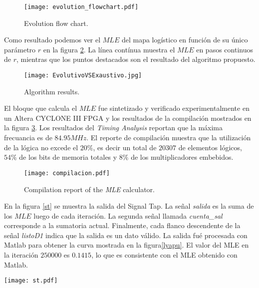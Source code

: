 \begin{figure}
	\centering
	\texttt{[image: evolution\_flowchart.pdf]}\\
	\caption{Evolution flow chart.}\label{diagramaflujo2}
\end{figure}

Como resultado podemos ver el $MLE$ del mapa logístico en función de su único parámetro $r$ en la figura \ref{resultadoAlgorithm}.
La línea contínua muestra el $MLE$ en pasos continuos de $r$, mientras que los puntos destacados son el resultado del algoritmo propuesto.

\begin{figure}
	\centering
	\texttt{[image: EvolutivoVSExaustivo.jpg]}\\
	\caption{Algorithm results.}\label{resultadoAlgorithm}
\end{figure}

El bloque que calcula el $MLE$ fue sintetizado y verificado experimentalmente en un Altera CYCLONE III FPGA y los resultados de la compilación mostrados en la figura \ref{compilacion}.
Los resultados del \textit{Timing Analysis} reportan que la máxima frecuancia es de $84.95MHz$.
El reporte de compilación muestra que la utilización de la lógica no excede el $20\%$, es decir un total de $20307$ de elementos lógicos, $54\%$ de los bits de memoria totales y $8\%$ de los multiplicadores embebidos.

\begin{figure}
	\centering
	\texttt{[image: compilacion.pdf]}\\
	\caption{Compilation report of the \textit{MLE} calculator.}\label{compilacion}
\end{figure}

En la figura \ref{st} se muestra la salida del Signal Tap.
La señal \textit{salida} es la suma de los $MLE$ luego de cada iteración.
La segunda señal llamada \textit{cuenta\_sal} corresponde a la sumatoria actual.
Finalmente, cada flanco descendente de la señal \textit{listoD1} indica que la salida es un dato válido.
La salida fué procesada con Matlab para obtener la curva mostrada en la figura\ref{lyapu}.
El valor del MLE en la iteración $250000$ es $0.1415$, lo que es consistente con el MLE obtenido con Matlab.

\begin{figure*}
	\centering
	\texttt{[image: st.pdf]}\\
	\caption{Signal Tap output.}\label{st}
\end{figure*}

